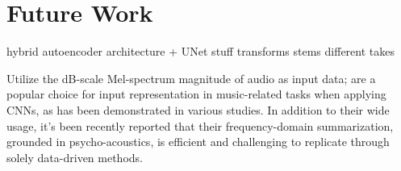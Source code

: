 \chapter{Future Work}

hybrid autoencoder architecture + UNet stuff
transforms
stems
different takes

Utilize the dB-scale Mel-spectrum magnitude of audio as input data; are a popular choice for input representation in music-related tasks when applying CNNs, as has been demonstrated in various studies. In addition to their wide usage, it's been recently reported that their frequency-domain summarization, grounded in psycho-acoustics, is efficient and challenging to replicate through solely data-driven methods. \cite{Kim2020OneStrategies}

\newpage